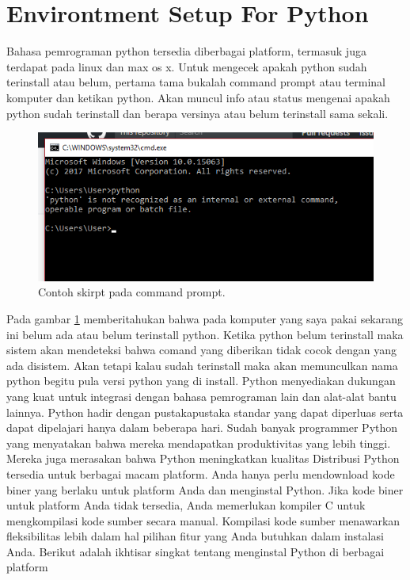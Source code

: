 \section{Environtment Setup For Python}
Bahasa pemrograman python tersedia diberbagai platform, termasuk juga terdapat pada 
linux dan max os x. Untuk mengecek apakah python sudah terinstall atau belum, pertama 
tama bukalah command prompt atau terminal komputer dan ketikan python. Akan muncul info 
atau status mengenai apakah python sudah terinstall dan berapa versinya atau belum terinstall sama sekali.
  \begin{figure}[ht]
	\centerline{\includegraphics[width=1\textwidth]{Plagiarisme/cmd.PNG}}
	\caption{Contoh skirpt pada command prompt.}
	\label{cmd}
	\end{figure}
Pada gambar \ref{cmd} memberitahukan bahwa pada komputer yang saya pakai sekarang ini belum ada atau belum terinstall python.
Ketika python belum terinstall maka sistem akan mendeteksi bahwa comand yang diberikan tidak cocok dengan yang ada disistem. 
Akan tetapi kalau sudah terinstall maka akan memunculkan nama python begitu pula versi python yang di install.
Python menyediakan dukungan yang kuat untuk integrasi dengan bahasa pemrograman lain dan alat-alat bantu lainnya. 
Python hadir dengan pustakapustaka standar yang dapat diperluas serta dapat dipelajari hanya dalam beberapa hari.
Sudah banyak programmer Python yang menyatakan bahwa mereka mendapatkan produktivitas yang lebih tinggi. 
Mereka juga merasakan bahwa Python meningkatkan kualitas 
Distribusi Python tersedia untuk berbagai macam platform.
Anda hanya perlu mendownload kode biner yang berlaku untuk platform Anda dan menginstal Python.
Jika kode biner untuk platform Anda tidak tersedia, Anda memerlukan kompiler C untuk mengkompilasi kode sumber secara manual. 
Kompilasi kode sumber menawarkan fleksibilitas lebih dalam hal pilihan fitur yang Anda butuhkan dalam instalasi Anda.
Berikut adalah ikhtisar singkat tentang menginstal Python di berbagai platform

